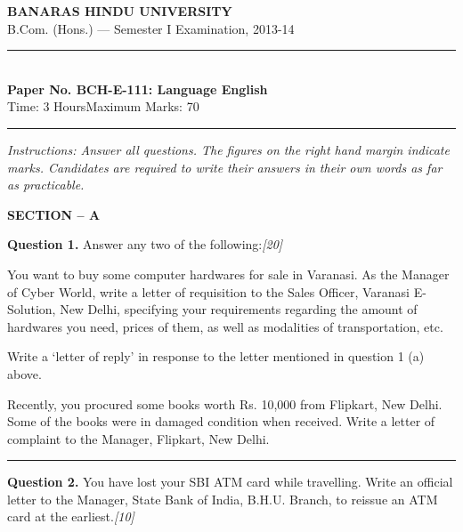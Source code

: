 \documentclass[11pt,a4paper]{article}
\newcommand{\pts}[1]{\hfill   \textit{[#1]}}
\begin{document}
\begin{center}
  {\large\bfseries BANARAS HINDU UNIVERSITY}\\[2pt]
  {\normalsize B.Com. (Hons.) --- Semester I Examination, 2013-14}\\[6pt]
  \rule{0.8\linewidth}{0.5pt}\\[6pt]
  {\large\bfseries Paper No. BCH-E-111: Language English}\\[4pt]
  {\normalsize Time: 3 Hours\hfill Maximum Marks: 70}
\end{center}

\rule{\linewidth}{0.4pt}

\smallskip



\noindent   \textit{Instructions: Answer all questions. The figures on the right hand margin indicate marks. Candidates are required to write their answers in their own words as far as practicable.}

\bigskip


\begin{center}
   \textbf{SECTION -- A}
\end{center}




\noindent   \textbf{Question 1.}
Answer any two of the following:\pts{20}

\begin{parts}
  \item You want to buy some computer hardwares for sale in Varanasi. As the Manager of Cyber World, write a letter of requisition to the Sales Officer, Varanasi E-Solution, New Delhi, specifying your requirements regarding the amount of hardwares you need, prices of them, as well as modalities of transportation, etc.
  \item Write a `letter of reply' in response to the letter mentioned in question 1 (a) above.
  \item Recently, you procured some books worth Rs. 10,000 from Flipkart, New Delhi. Some of the books were in damaged condition when received. Write a letter of complaint to the Manager, Flipkart, New Delhi.
\end{parts}

\medskip\rule{\linewidth}{0.2pt}




\noindent   \textbf{Question 2.}
You have lost your SBI ATM card while travelling. Write an official letter to the Manager, State Bank of India, B.H.U. Branch, to reissue an ATM card at the earliest.\pts{10}
\end{document}
